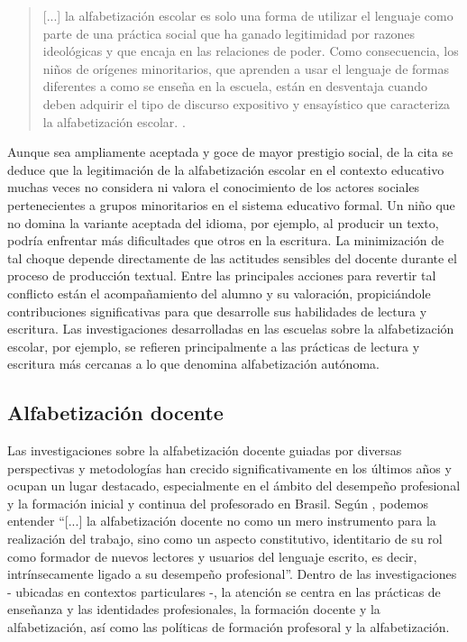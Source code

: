 \documentclass[spanish]{textolivre}
\begin{document}
\begin{quote}
    [...] la alfabetización escolar es solo una forma de utilizar el lenguaje como parte de una práctica social que ha ganado legitimidad por razones ideológicas y que encaja en las relaciones de poder. Como consecuencia, los niños de orígenes minoritarios, que aprenden a usar el lenguaje de formas diferentes a como se enseña en la escuela, están en desventaja cuando deben adquirir el tipo de discurso expositivo y ensayístico que caracteriza la alfabetización escolar. \cite[p. 73]{zavala_quem_2010}.
\end{quote}

Aunque sea ampliamente aceptada y goce de mayor prestigio social, de la cita se deduce que la legitimación de la alfabetización escolar en el contexto educativo muchas veces no considera ni valora el conocimiento de los actores sociales pertenecientes a grupos minoritarios en el sistema educativo formal. Un niño que no domina la variante aceptada del idioma, por ejemplo, al producir un texto, podría enfrentar más dificultades que otros en la escritura. La minimización de tal choque depende directamente de las actitudes sensibles del docente durante el proceso de producción textual. Entre las principales acciones para revertir tal conflicto están el acompañamiento del alumno y su valoración, propiciándole contribuciones significativas para que desarrolle sus habilidades de lectura y escritura. Las investigaciones desarrolladas en las escuelas sobre la alfabetización escolar, por ejemplo, se refieren principalmente a las prácticas de lectura y escritura más cercanas a lo que \textcite{street_literacy_1984, street_letramentos_2014} denomina alfabetización autónoma.

\subsection{Alfabetización docente}\label{sec-docente}
Las investigaciones sobre la alfabetización docente guiadas por diversas perspectivas y metodologías han crecido significativamente en los últimos años y ocupan un lugar destacado, especialmente en el ámbito del desempeño profesional y la formación inicial y continua del profesorado en Brasil. Según \textcite[p. 21]{kleiman_projetos_2009}, podemos entender “[...] la alfabetización docente no como un mero instrumento para la realización del trabajo, sino como un aspecto constitutivo, identitario de su rol como formador de nuevos lectores y usuarios del lenguaje escrito, es decir, intrínsecamente ligado a su desempeño profesional”. Dentro de las investigaciones - ubicadas en contextos particulares -, la atención se centra en las prácticas de enseñanza y las identidades profesionales, la formación docente y la alfabetización, así como las políticas de formación profesoral y la alfabetización.
\end{document}
